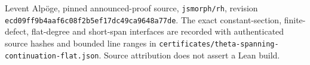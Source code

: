 Levent Alp\"oge, pinned announced-proof source,
\texttt{jsmorph/rh}, revision
\texttt{ecd09ff9b4aaf6c08f2b5ef17dc49ca9648a77de}.
The exact constant-section, finite-defect, flat-degree and short-span
interfaces are recorded with authenticated source hashes and bounded
line ranges in
\texttt{certificates/theta-spanning-continuation-flat.json}.
Source attribution does not assert a Lean build.
